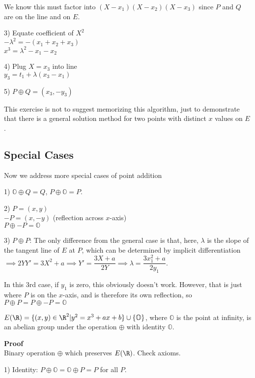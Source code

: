 \documentclass[10pt]{article}
\renewcommand{\O}{\mathbb{O}}
\begin{document}
We know this must factor into $(X-x_1)(X-x_2)(X-x_3)$ since $P$ and $Q$ are on the line and on $E$.

3) Equate coefficient of $X^2$\\
$-\lambda^2 = -(x_1 + x_2 + x_3)$\\
$x^3 = \lambda^2 - x_1 - x_2$

4) Plug $X = x_3$ into line\\
$y_3 = t_1 + \lambda(x_3 - x_1)$

5) $P\oplus Q = (x_3, -y_3)$

\begin{rmk}
    This exercise is not to suggest memorizing this algorithm, just to demonstrate that there is a general solution method for two points with distinct $x$ values on $E$.
\end{rmk}

\subsection{Special Cases} Now we address more special cases of point addition

1) $\O \oplus Q = Q$, $P \oplus \O = P$.

2) $P = (x, y)$\\
$-P = (x, -y)$ (reflection across $x$-axis)\\
$P \oplus -P = \O$

3) $P \oplus P$: The only difference from the general case is that, here, $\lambda$ is the slope of the tangent line of $E$ at $P$, which can be determined by implicit differentiation $\implies 2YY' = 3X^2 + a \implies Y'  = \dfrac{3X + a}{2Y} \implies \lambda = \dfrac{3x_1^2 + a}{2y_1}$. 

\begin{rmk}
    In this 3rd case, if $y_1$ is zero, this obviously doesn't work. However, that is just where $P$ is on the $x$-axis, and is therefore its own reflection, so $P \oplus P = P \oplus -P = \O$
\end{rmk}

\begin{prop}
    $E(\R) = \{(x, y) \in \R^2 | y^2 = x^3 + ax + b\} \cup \{\O\}$, where $\O$ is the point at infinity, is an abelian group under the operation $\oplus$ with identity $\O$. 
\end{prop}
\textbf{Proof}\\
Binary operation $\oplus$ which preserves $E(\R)$. Check axioms.

1) Identity: $P \oplus \O = \O\oplus P = P$ for all $P$.
\end{document}
